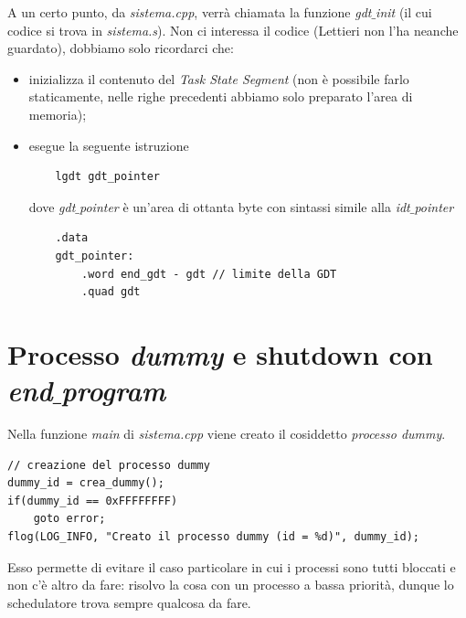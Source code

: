\documentclass[11pt]{report}
\theoremstyle{definition}
\begin{document}
A un certo punto, da \emph{sistema.cpp}, verrà chiamata la funzione \emph{gdt$\_$init} (il cui codice si trova in \emph{sistema.s}). Non ci interessa il codice (Lettieri non l'ha neanche guardato), dobbiamo solo ricordarci che:
\begin{itemize}
	\item inizializza il contenuto del \emph{Task State Segment} (non è possibile farlo staticamente, nelle righe precedenti abbiamo solo preparato l'area di memoria);
	\item esegue la seguente istruzione
	\begin{verbatim}
	lgdt gdt_pointer
	\end{verbatim}
	dove \emph{gdt$\_$pointer} è un'area di ottanta byte con sintassi simile alla \emph{idt$\_$pointer}
	\begin{verbatim}
	.data
	gdt_pointer:
	    .word end_gdt - gdt // limite della GDT
	    .quad gdt
	\end{verbatim}
\end{itemize}
\small 
\normalsize 



\section{Processo \emph{dummy} e shutdown con \emph{end$\_$program}}
Nella funzione \emph{main} di \emph{sistema.cpp} viene creato il cosiddetto \emph{processo dummy}.
\small 
\begin{verbatim}
// creazione del processo dummy
dummy_id = crea_dummy();
if(dummy_id == 0xFFFFFFFF)
    goto error;
flog(LOG_INFO, "Creato il processo dummy (id = %d)", dummy_id);
\end{verbatim}
\normalsize 
Esso permette di evitare il caso particolare in cui i processi sono tutti bloccati e non c'è altro da fare: risolvo la cosa con un processo a bassa priorità, dunque lo schedulatore trova sempre qualcosa da fare.
\end{document}
